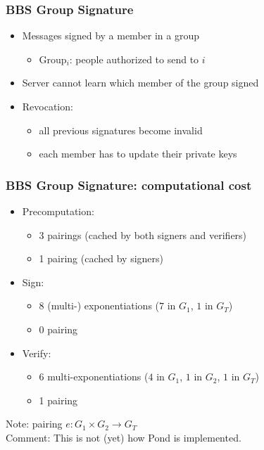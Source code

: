 \begin{frame}
	\frametitle{BBS Group Signature}

	\begin{itemize}
	\setlength\itemsep{1em}
	\item	Messages signed by a member in a group
		\begin{itemize}
		\item	Group$_i$: people authorized to send to $i$
		\end{itemize}
	\item	Server cannot learn which member of the group signed
	\item	Revocation:
		\begin{itemize}
		\item	all previous signatures become invalid
		\item	each member has to update their private keys
		\end{itemize}
	\end{itemize}
\end{frame}

\begin{frame}
	\frametitle{BBS Group Signature: computational cost}

	\begin{itemize}
	\setlength\itemsep{1em}
	\item	Precomputation:
		\begin{itemize}
		\item	3 pairings (cached by both signers and verifiers)
		\item	1 pairing\phantom{s}  (cached by signers)
		\end{itemize}
	\item	Sign:
		\begin{itemize}
		\item	8 (multi-) exponentiations ($7$ in $G_1$, $1$ in $G_T$)
		\item	0 pairing
		\end{itemize}
	\item	Verify:
		\begin{itemize}
		\item	6 multi-exponentiations ($4$ in $G_1$, $1$ in $G_2$, $1$ in $G_T$)
		\item	1 pairing
		\end{itemize}
	\end{itemize}

	Note: pairing $e: G_1 \times G_2 \rightarrow G_T$\\
	\vspace{1em}
	\pause
	Comment: This is not (yet) how Pond is implemented.

\end{frame}
